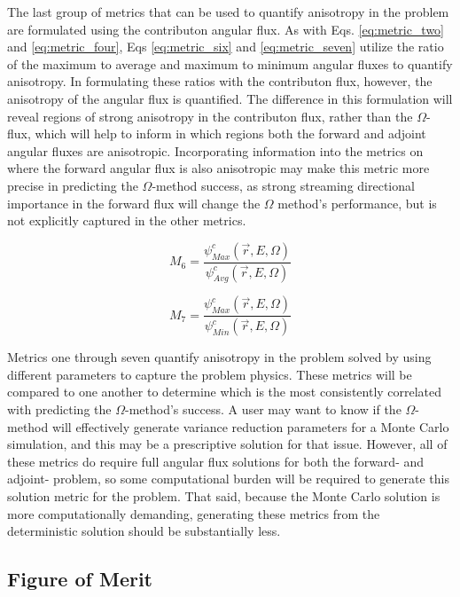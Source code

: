 The last group of metrics that can be used to quantify anisotropy in the problem
are formulated using the contributon angular flux. As with Eqs.
\ref{eq:metric_two} and \ref{eq:metric_four}, Eqs \ref{eq:metric_six} and
\ref{eq:metric_seven} utilize the ratio of the maximum to average and maximum to
minimum angular fluxes to quantify anisotropy. In formulating these ratios with
the contributon flux, however, the anisotropy of the angular flux is quantified.
The difference in this formulation  will reveal regions of strong anisotropy
in the contributon flux, rather than the $\Omega$-flux,
which will help to inform in which regions both the forward and adjoint angular
fluxes are anisotropic. Incorporating information into the metrics on where the
forward angular flux is also anisotropic may make this metric more precise in
predicting the $\Omega$-method success, as strong streaming directional
importance in the forward flux will change the $\Omega$ method's performance,
but is not explicitly captured in the other metrics.

\begin{equation}
  M_{6} = \frac{\psi^{c}_{Max}(\vec {r} ,E,\Omega)}{\psi^{c}_{Avg}(\vec {r}
                ,E,\Omega)}
  \label{eq:metric_six}
\end{equation}

\begin{equation}
  M_{7} = \frac{\psi^{c}_{Max}(\vec {r} ,E,\Omega)}{\psi^{c}_{Min}(\vec {r}
                ,E,\Omega)}
  \label{eq:metric_seven}
\end{equation}

Metrics one through seven quantify anisotropy
in the problem solved by using different parameters to capture the problem
physics. These metrics will be compared to one another to determine which is the
most consistently correlated with predicting the $\Omega$-method's success. A
user may want to know if the $\Omega$-method will effectively generate variance
reduction parameters for a Monte Carlo simulation, and this may be a
prescriptive solution for that issue. However, all of these metrics do require
full angular flux solutions for both the forward- and adjoint- problem, so some
computational burden will be required to generate this solution metric for the
problem. That said, because the Monte Carlo solution is more computationally
demanding, generating these metrics from the deterministic solution should be
substantially less.

\subsection{Figure of Merit}

